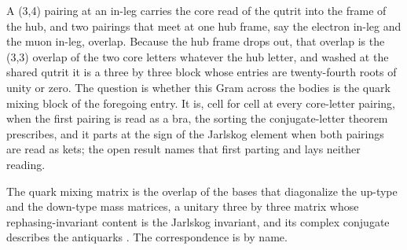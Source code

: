 A (3,4) pairing at an in-leg carries the core read of the qutrit into the frame of the hub, and two pairings that meet at one hub frame, say the electron in-leg and the muon in-leg, overlap. Because the hub frame drops out, that overlap is the (3,3) overlap of the two core letters whatever the hub letter, and washed at the shared qutrit it is a three by three block whose entries are twenty-fourth roots of unity or zero. The question is whether this Gram across the bodies is the quark mixing block of the foregoing entry. It is, cell for cell at every core-letter pairing, when the first pairing is read as a bra, the sorting the conjugate-letter theorem prescribes, and it parts at the sign of the Jarlskog element when both pairings are read as kets; the open result names that first parting and lays neither reading.
\begin{chbridge}
The quark mixing matrix is the overlap of the bases that diagonalize the up-type and the down-type mass matrices, a unitary three by three matrix whose rephasing-invariant content is the Jarlskog invariant, and its complex conjugate describes the antiquarks \cite{Cabibbo1963,Jarlskog1985}. The correspondence is by name.
\end{chbridge}
